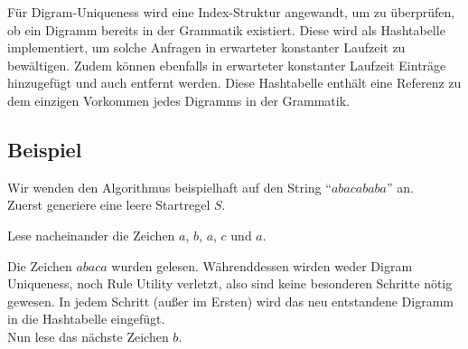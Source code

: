 Für Digram-Uniqueness wird eine Index-Struktur angewandt, um zu überprüfen, ob ein Digramm bereits in der Grammatik existiert. Diese wird als Hashtabelle implementiert, um solche Anfragen in erwarteter konstanter Laufzeit zu bewältigen. Zudem können ebenfalls in erwarteter konstanter Laufzeit Einträge hinzugefügt und auch entfernt werden. Diese Hashtabelle enthält eine Referenz zu dem einzigen Vorkommen jedes Digramms in der Grammatik. 


\subsection{Beispiel}

Wir wenden den Algorithmus beispielhaft auf den String \enquote{$abacababa$} an.\\
Zuerst generiere eine leere Startregel $S$.
\begin{figure}[H]
	\centering
\end{figure}
Lese nacheinander die Zeichen $a$, $b$, $a$, $c$ und $a$.

\begin{figure}[H]
	\centering
\end{figure}
Die Zeichen $abaca$ wurden gelesen. Währenddessen wirden weder Digram Uniqueness, noch Rule Utility verletzt, also sind keine besonderen Schritte nötig gewesen. In jedem Schritt (außer im Ersten) wird das neu entstandene Digramm in die Hashtabelle eingefügt.\\
Nun lese das nächste Zeichen $b$.


